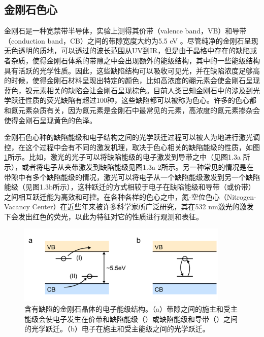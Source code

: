 \documentclass[type = bachelor]{whu-thesis}
\begin{document}
\subsection{金刚石色心}
金刚石是一种宽禁带半导体，实验上测得其价带（valence band，VB）和导带（conduction band，CB）之间的带隙宽度大约为5.5 \unit{\eV} \cite{mildren2013optical,cheng2023bandgap,wort2008diamond}。尽管纯净的金刚石呈现无色透明的质地，可以透过的波长范围从UV到IR，但是由于晶格中存在的缺陷或者杂质，使得金刚石体系的带隙之中会出现额外的能级结构，其中的一些能级结构具有活跃的光学性质。因此，这些缺陷结构可以吸收可见光，并在缺陷浓度足够高的时候，使得金刚石材料呈现出特定的颜色，比如高浓度的硼元素会使金刚石呈现蓝色，镍元素相关的缺陷会让金刚石呈现棕色。目前人类已知金刚石中的涉及到光学跃迁性质的荧光缺陷有超过100种，这些缺陷都可以被称为色心\cite{koizumi2008physics,jelezko2006single}。许多的色心都和氮元素杂质有关，因为氮元素是金刚石中最常见的元素，高浓度的氮元素掺杂会使得金刚石呈现黄色的色泽\cite{breeding2020naturally, zaitsev2016spectroscopic}。

金刚石色心种的缺陷能级和电子结构之间的光学跃迁过程可以被人为地进行激光调控，在这个过程中会有不同的激发机理，取决于色心相关的缺陷能级的性质，如图 \ref{fig: Optical Transition}所示。比如，激光的光子可以将缺陷能级的电子激发到导带之中（见图1.3a \uppercase\expandafter{}所示），或者将电子从夹带激发到缺陷能级见图1.3a \uppercase\expandafter{\romannumeral2所示}。另一种常见的情况是在带隙中有多个缺陷能级的情况，激光可以将电子从一个缺陷能级激发到另一个缺陷能级（见图1.3b所示），这种跃迁的方式相较于电子在缺陷能级和导带（或价带）之间相互跃迁能为高效和可控\cite{gali2011time,gali2012excitation}。在各种各样的色心之中，氮-空位色心（Nitrogen-Vacancy Center）在近些年来被许多科学家所广泛研究，其在532 nm激光的激发下会发出红色的荧光，以此为特征对它的性质进行观测和表征\cite{doherty2013nitrogen}。

\begin{figure}
  \centering
  \includegraphics[width=0.9\textwidth]{figures/Chapter 1/Optical Transition.png}
  \caption[含有缺陷的金刚石晶体的电子能级结构]{含有缺陷的金刚石晶体的电子能级结构。（a）带隙之间的施主和受主能级会使电子发生在价带和缺陷能级（\uppercase\expandafter{}）或缺陷能级和导带（\uppercase\expandafter{}）之间的光学跃迁。（b）电子在施主和受主能级之间的光学跃迁。}
  \label{fig: Optical Transition}
\end{figure}
\end{document}
